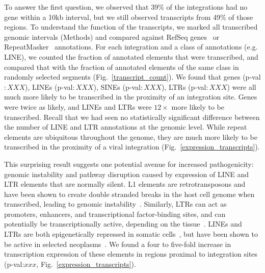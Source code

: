 \documentclass[11pt]{article}
\begin{document}
To answer the first question, we observed that 39\% of the
integrations had no gene within a 10kb interval, but we still observed
transcripts from 49\% of those regions. To understand the function of
the transcripts, we marked all transcribed genomic intervals (Methods)
and compared against RefSeq genes~\cite{OLeary2016} or
RepeatMasker~\cite{Tarailo-Graovac2009} annotations. For each
integration and a class of annotations (e.g. LINE), we counted the
fraction of annotated elements that were transcribed, and compared
that with the fraction of annotated elements of the same class in
randomly selected segments (Fig.~\ref{transcript_count}). We found
that genes (p-val$:XXX$), LINEs (p-val$:XXX$), SINEs (p-val$:XXX$),
LTRs (p-val$:XXX$) were all much more likely to be transcribed in the
proximity of an integration site. Genes were twice as likely, and
LINEs and LTRs were $12\times$ more likely to be transcribed. Recall
that we had seen no statistically significant difference between the
number of LINE and LTR annotations at the genomic level. While repeat
elements are ubiquitous throughout the genome, they are much more
likely to be transcribed in the proximity of a viral integration
(Fig.~\ref{expression_transcripts}).


This surprising result suggests one potential avenue for increased
pathogenicity: genomic instability and pathway disruption caused by
expression of LINE and LTR elements that are normally silent. L1
elements are retrotransposons and have been shown to create double
stranded breaks in the host cell genome when transcribed, leading to
genomic instability~\cite{Gasior2006}.  Similarly, LTRs can act as
promoters, enhancers, and transcriptional factor-binding sites, and
can potentially be transcriptionally active, depending on the
tissue~\cite{Yu2013}. LINEs and LTRs are both epigenetically repressed
in somatic cells~\cite{Kinomoto2007,Sigurdsson2012}, but have been
shown to be active in selected
neoplasms~\cite{Rodic2013,Xiao-Jie2016,Romanish2010}. We found a four
to five-fold increase in transcription expression of these elements in
regions proximal to integration sites (p-val:$xxx$,
Fig.~\ref{expression_transcripts}).
\end{document}
